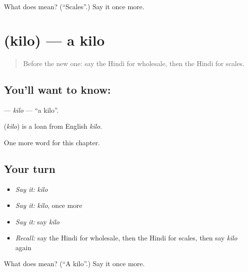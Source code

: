 \begin{tcolorbox}[breakable,colback=teal!4,colframe=teal!35!black,title={Before you move on}]
What does  mean? (\textquotedblleft{}Scales\textquotedblright{}.) Say it once more.
\end{tcolorbox}
\section[\texorpdfstring{\hi{किलो} (kilo)}{किलो (kilo)}]{ (kilo) — a kilo}

\label{lesson:HI-C251-kilo}



\begin{quote}
Before the new one: say the Hindi for wholesale, then the Hindi for scales.
\end{quote}

\subsection*{You'll want to know: }
\textbf{} — \emph{kilo} — \textquotedblleft{}a kilo\textquotedblright{}.

\begin{cousinweb}
\textbf{} (\emph{kilo}) is a loan from English \emph{kilo}.
\end{cousinweb}

\begin{grammarlens}[title={What you've built}]
One more word for this chapter.
\end{grammarlens}

\subsection*{Your turn}
\begin{itemize}
\raggedright
  \item \emph{Say it:} \emph{kilo}
  \item \emph{Say it:} \emph{kilo}, once more
  \item \emph{Say it:} say \emph{kilo}
  \item \emph{Recall:} say the Hindi for wholesale, then the Hindi for scales, then say \emph{kilo} again
\end{itemize}

\begin{tcolorbox}[breakable,colback=teal!4,colframe=teal!35!black,title={Before you move on}]
What does  mean? (\textquotedblleft{}A kilo\textquotedblright{}.) Say it once more.
\end{tcolorbox}

